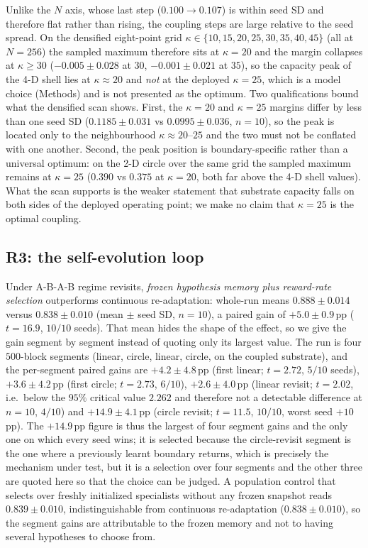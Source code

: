 \documentclass[preprint,12pt]{elsarticle}
\begin{document}
\begin{sloppypar}
Unlike the $N$ axis, whose last step ($0.100\to0.107$) is within seed SD and
therefore flat rather than rising, the coupling steps are large relative to
the seed spread. On the densified eight-point grid
$\kappa\in\{10,15,20,25,30,35,40,45\}$ (all at $N=256$) the sampled maximum
therefore sits at $\kappa=20$ and the margin collapses at $\kappa\geq30$
($-0.005\pm0.028$ at $30$, $-0.001\pm0.021$ at $35$), so the capacity peak of
the 4-D shell lies at $\kappa\approx20$ and \emph{not} at the deployed
$\kappa=25$, which is a model choice (Methods) and is not presented as the
optimum. Two qualifications bound what the densified scan shows. First, the
$\kappa=20$ and $\kappa=25$ margins differ by less than one seed SD
($0.1185\pm0.031$ vs $0.0995\pm0.036$, $n=10$), so the peak is located only to
the neighbourhood $\kappa\approx20$--$25$ and the two must not be conflated
with one another. Second, the peak position is boundary-specific rather than a
universal optimum: on the 2-D circle over the same grid the sampled maximum
remains at $\kappa=25$ ($0.390$ vs $0.375$ at $\kappa=20$, both far above the
4-D shell values). What the scan supports is the
weaker statement that substrate capacity falls on both sides of the
deployed operating point; we make no claim that $\kappa=25$ is the optimal
coupling.
\end{sloppypar}

\subsection{R3: the self-evolution loop}
\label{sec:r3}

Under A-B-A-B regime revisits, \emph{frozen hypothesis memory plus
reward-rate selection} outperforms continuous re-adaptation: whole-run means
$0.888\pm0.014$ versus $0.838\pm0.010$ (mean $\pm$ seed SD, $n=10$), a paired
gain of $+5.0\pm0.9$\,pp ($t=16.9$, $10/10$ seeds). That mean hides the shape
of the effect, so we give the gain segment by segment instead of quoting only
its largest value. The run is four $500$-block segments (linear, circle,
linear, circle, on the coupled substrate), and the per-segment paired gains
are $+4.2\pm4.8$\,pp (first linear; $t=2.72$, $5/10$ seeds), $+3.6\pm4.2$\,pp
(first circle; $t=2.73$, $6/10$), $+2.6\pm4.0$\,pp (linear revisit; $t=2.02$,
i.e.\ below the $95\%$ critical value $2.262$ and therefore not a detectable
difference at $n=10$, $4/10$) and $+14.9\pm4.1$\,pp (circle revisit; $t=11.5$,
$10/10$, worst seed $+10$\,pp). The $+14.9$\,pp figure is thus the largest of
four segment gains and the only one on which every seed wins; it is selected
because the circle-revisit segment is the one where a previously learnt
boundary returns, which is precisely the mechanism under test, but it is a
selection over four segments and the other three are quoted here so that the
choice can be judged. A population control that selects over freshly
initialized specialists without any frozen snapshot reads
$0.839\pm0.010$, indistinguishable from continuous re-adaptation
($0.838\pm0.010$), so the segment gains are attributable to the frozen memory
and not to having several hypotheses to choose from.
\end{document}
